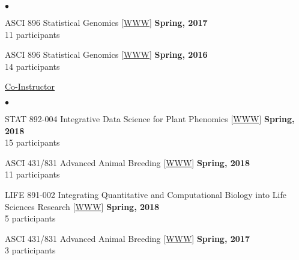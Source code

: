 \documentclass[margin,line,10pt]{res}
\newenvironment{list2}{
  \begin{list}{$\bullet$}{%
      \setlength{\itemsep}{0in}
      \setlength{\parsep}{0in} \setlength{\parskip}{0in}
      \setlength{\topsep}{0in} \setlength{\partopsep}{0in} 
      \setlength{\leftmargin}{0.2in}}}{\end{list}}
\begin{document}
\begin{resume}
\begin{list2}
\item ASCI 896 Statistical Genomics [\textcolor{blue}{\href{http://morotalab.org/asci896-2017/ASCI896.html}{WWW}}]
  \hfill {\bf Spring, 2017} \\
  11  participants   %

  \vspace{0.5cm}

\item ASCI 896 Statistical Genomics [\textcolor{blue}{\href{http://morotalab.org/asci896-2016/ASCI896.html}{WWW}}]
  \hfill {\bf Spring, 2016} \\
14 participants %

\end{list2}
\vspace{.01pt}
        

\underline{Co-Instructor} 
\vspace{0.4cm}
\begin{list2}
  
\item STAT 892-004 Integrative Data Science for Plant Phenomics [\textcolor{blue}{\href{http://morotalab.org/stat892-2018/STAT892.html}{WWW}}]
  \hfill {\bf Spring, 2018} \\
  15 participants 

\vspace{0.5cm}
  
\item ASCI 431/831 Advanced Animal Breeding [\textcolor{blue}{\href{http://morotalab.org/asci431-2018/ASCI431-831.html}{WWW}}]
  \hfill {\bf Spring, 2018} \\
  11 participants 

  \vspace{0.5cm}

\item LIFE 891-002 Integrating Quantitative and Computational Biology into Life Sciences Research [\textcolor{blue}{\href{http://morotalab.org/life431-2018/life431-831.html}{WWW}}]
  \hfill {\bf Spring, 2018}  \\
 5 participants  

 \vspace{0.5cm}

\item ASCI 431/831 Advanced Animal Breeding [\textcolor{blue}{\href{http://morotalab.org/asci431-2017/ASCI431-831.html}{WWW}}]
  \hfill {\bf Spring, 2017}  \\
 3 participants 
\end{list2}


\end{resume}
\end{document}
